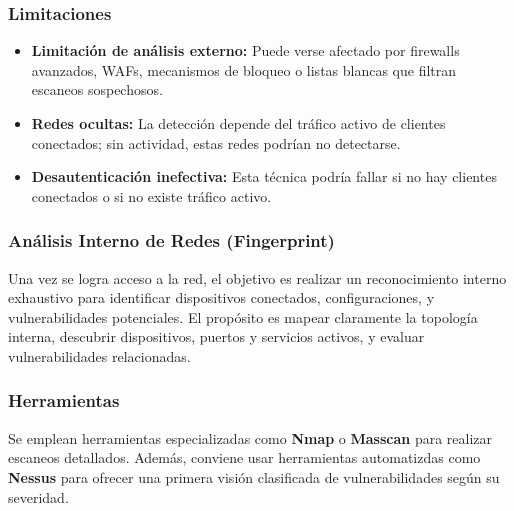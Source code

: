 \documentclass[a4paper, 11pt]{article}
\begin{document}
\subsubsection*{Limitaciones}

\begin{itemize}
    \item \textbf{Limitación de análisis externo:} Puede verse afectado por firewalls avanzados, WAFs, mecanismos de bloqueo o listas blancas que filtran escaneos sospechosos.
    
    \item \textbf{Redes ocultas:} La detección depende del tráfico activo de clientes conectados; sin actividad, estas redes podrían no detectarse.
    
    \item \textbf{Desautenticación inefectiva:} Esta técnica podría fallar si no hay clientes conectados o si no existe tráfico activo.
\end{itemize}


































\subsubsection{Análisis Interno de Redes (Fingerprint)}

Una vez se logra acceso a la red, el objetivo es realizar un reconocimiento interno exhaustivo para identificar dispositivos conectados, configuraciones, y vulnerabilidades potenciales. El propósito es mapear claramente la topología interna, descubrir dispositivos, puertos y servicios activos, y evaluar vulnerabilidades relacionadas.


\subsubsection*{Herramientas}
Se emplean herramientas especializadas como \textbf{Nmap} o \textbf{Masscan} para realizar escaneos detallados. Además, conviene usar 
herramientas automatizdas como \textbf{Nessus} para ofrecer una primera visión clasificada de vulnerabilidades según su severidad.
\end{document}
